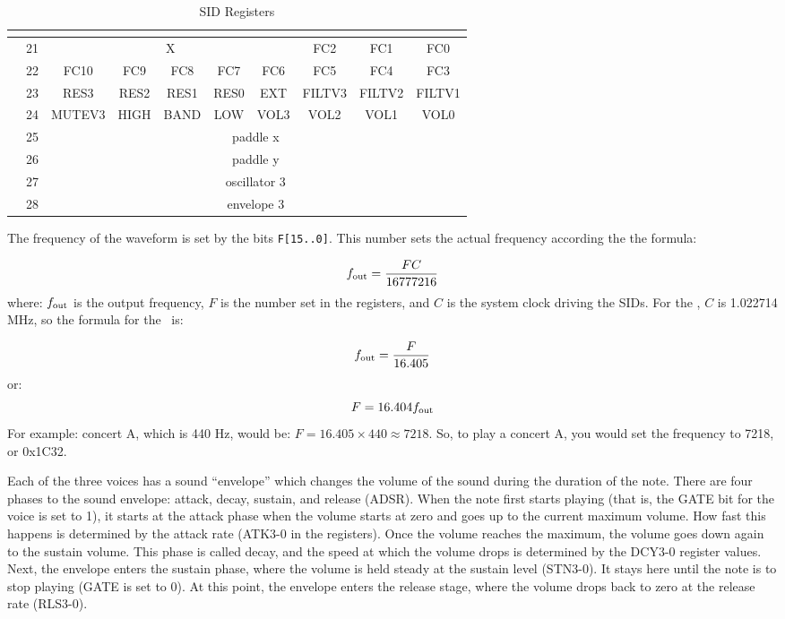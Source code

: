 \begin{table}[h]
\begin{center}
\begin{tabular}{|c|c|c|c|c|c|c|c|c|c|}
            \multicolumn{10}{c}{} \\ \hline

            \multirow{7}{*}{} & 21 & \multicolumn{5}{|c|}{X} & FC2 & FC1 & FC0 \\ \cline{2-10}
            & 22 & FC10 & FC9 & FC8 & FC7 & FC6 & FC5 & FC4 & FC3 \\ \cline{2-10}
            & 23 & RES3 & RES2 & RES1 & RES0 & EXT & FILTV3 & FILTV2 & FILTV1 \\ \cline{2-10}
            & 24 & MUTEV3 & HIGH & BAND & LOW & VOL3 & VOL2 & VOL1 & VOL0 \\ \cline{2-10}
            & 25 & \multicolumn{8}{|c|}{paddle x} \\ \cline{2-10}
            & 26 & \multicolumn{8}{|c|}{paddle y} \\ \cline{2-10}
            & 27 & \multicolumn{8}{|c|}{oscillator 3} \\ \cline{2-10}
            & 28 & \multicolumn{8}{|c|}{envelope 3} \\ \hline
		\end{tabular}
	\end{center}
	\caption{SID Registers}
	\label{tab:sid_registers}
\end{table}

The frequency of the waveform is set by the bits \verb+F[15..0]+. This number sets the actual frequency according the the formula:

\[
f_{\rm out} = \frac{FC}{16777216}
\]
where: $f_{\rm out}$ is the output frequency, $F$ is the number set in the registers, and $C$ is the system clock driving the SIDs. For the \jr, $C$ is 1.022714 MHz, so the formula for the \jr\ is:

\[
f_{\rm out} = \frac{F}{16.405}
\]
or:
\[
F = 16.404f_{\rm out}
\]
For example: concert A, which is 440 Hz, would be: $F = 16.405 \times 440 \approx 7218$. So, to play a concert A, you would set the frequency to 7218, or 0x1C32.

Each of the three voices has a sound ``envelope'' which changes the volume of the sound during the duration of the note. There are four phases to the sound envelope: attack, decay, sustain, and release (ADSR). When the note first starts playing (that is, the GATE bit for the voice is set to 1), it starts at the attack phase when the volume starts at zero and goes up to the current maximum volume. How fast this happens is determined by the attack rate (ATK3-0 in the registers). Once the volume reaches the maximum, the volume goes down again to the sustain volume. This phase is called decay, and the speed at which the volume drops is determined by the DCY3-0 register values. Next, the envelope enters the sustain phase, where the volume is held steady at the sustain level (STN3-0). It stays here until the note is to stop playing (GATE is set to 0). At this point, the envelope enters the release stage, where the volume drops back to zero at the release rate (RLS3-0).

